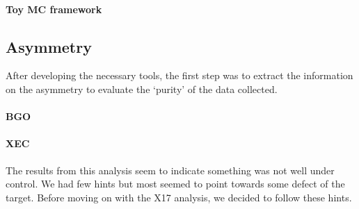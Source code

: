 \begin{refsection}
        \paragraph{Toy MC framework}

    \subsection{Asymmetry}
        After developing the necessary tools, the first step was to extract the information on the asymmetry to evaluate the `purity' of the data collected.
        
        \paragraph{BGO}
        \paragraph{XEC}

        \noindent
        The results from this analysis seem to indicate something was not well under control.
        We had few hints but most seemed to point towards some defect of the target. 
        Before moving on with the X17 analysis, we decided to follow these hints.


\end{refsection}
